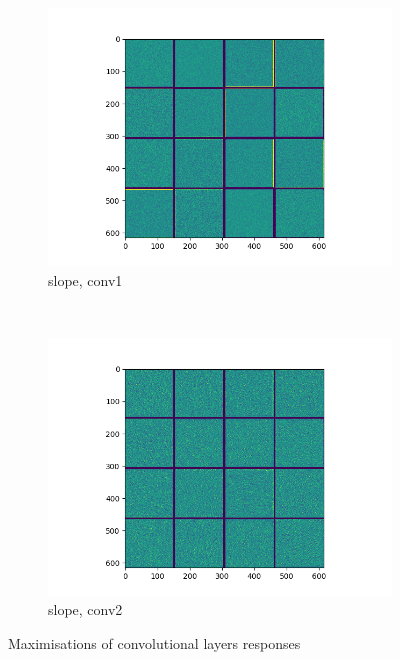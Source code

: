\documentclass[11pt,a4paper]{article}
\begin{document}
\begin{figure}[t]
    \begin{subfigure}[b]{0.4\textwidth}
        \includegraphics[width=\textwidth]{graphics/nn_visualisation/convnet_filters_slope_conv2d.png}
        \caption{slope, conv1}
    \end{subfigure}
    ~
    \begin{subfigure}[b]{0.4\textwidth}
        \includegraphics[width=\textwidth]{graphics/nn_visualisation/convnet_filters_slope_conv2d_1.png}
        \caption{slope, conv2}
    \end{subfigure}

    \caption{Maximisations of convolutional layers responses}
    \label{fig:nn_vis_conv_filters}
\end{figure}
\end{document}
